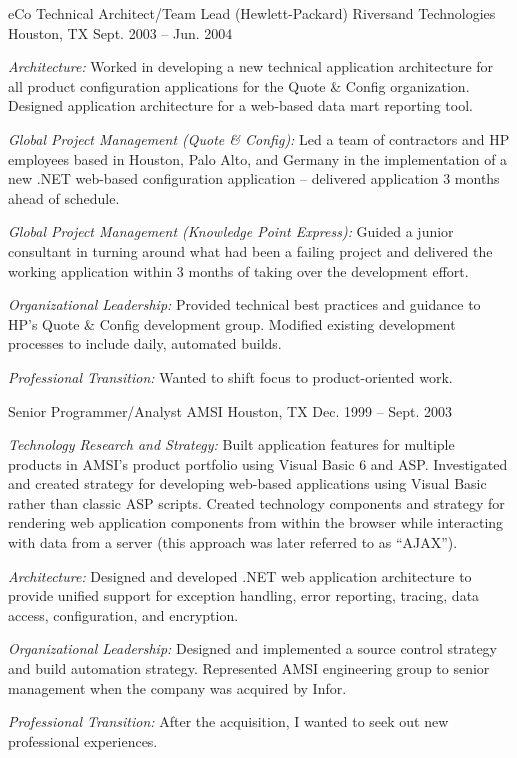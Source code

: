 \begin{cventries}

\cventry 
{eCo Technical Architect/Team Lead (Hewlett-Packard)}
{Riversand Technologies}
{Houston, TX}
{Sept. 2003 – Jun. 2004}
{ %
\begin{cvitems}
\item {\emph{Architecture:} Worked in developing a new technical application architecture for all product configuration applications for the Quote \& Config organization. Designed application architecture for a web-based data mart reporting tool.}
\item {\emph{Global Project Management (Quote \& Config):} Led a team of contractors and HP employees based in Houston, Palo Alto, and Germany in the implementation of a new .NET web-based configuration application – delivered application 3 months ahead of schedule.}
\item {\emph{Global Project Management (Knowledge Point Express):} Guided a junior consultant in turning around what had been a failing project and delivered the working application within 3 months of taking over the development effort.}
\item {\emph{Organizational Leadership:} Provided technical best practices and guidance to HP's Quote \& Config development group. Modified existing development processes to include daily, automated builds.}
\item {\emph{Professional Transition:} Wanted to shift focus to product-oriented work.}
\end{cvitems}
}


\cventry 
{Senior Programmer/Analyst}
{AMSI}
{Houston, TX}
{Dec. 1999 – Sept. 2003}
{ %
\begin{cvitems}
\item {\emph{Technology Research and Strategy:} Built application features for multiple products in AMSI’s product portfolio using Visual Basic 6 and ASP. Investigated and created strategy for developing web-based applications using Visual Basic rather than classic ASP scripts. Created technology components and strategy for rendering web application components from within the browser while interacting with data from a server (this approach was later referred to as “AJAX”).}
\item {\emph{Architecture:} Designed and developed .NET web application architecture to provide unified support for exception handling, error reporting, tracing, data access, configuration, and encryption.}
\item {\emph{Organizational Leadership:} Designed and implemented a source control strategy and build automation strategy. Represented AMSI engineering group to senior management when the company was acquired by Infor.}
\item {\emph{Professional Transition:} After the acquisition, I wanted to seek out new professional experiences.}
\end{cvitems}
}


\end{cventries}